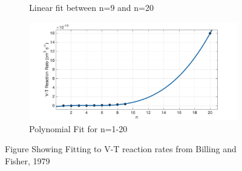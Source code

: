 \documentclass[11pt, oneside]{article}   	%
\begin{document}
\begin{figure}
\begin{subfigure}{0.5\textwidth}
\caption{Linear fit between n=9 and n=20}
\end{subfigure}
\begin{subfigure}{0.5\textwidth}
\includegraphics[width=\textwidth]{Figures/Polynomial}
\caption{Polynomial Fit for n=1-20}
\end{subfigure}
\caption{Figure Showing Fitting to V-T reaction rates from Billing and Fisher, 1979 \cite{Billing1979vv}}
\label{fig:fits}
\end{figure}
\end{document}

